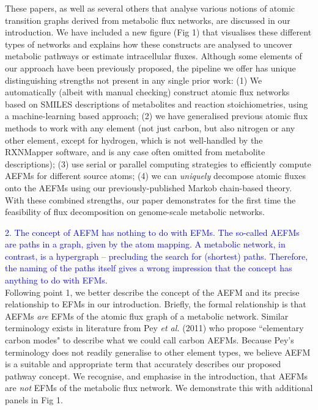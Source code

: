 \documentclass[11pt]{article}
\begin{document}
These papers, as well as several others that analyse various notions of
atomic transition graphs derived from metabolic flux networks, are
discussed in our introduction. We have included a new figure (Fig 1) that
visualises these different types of networks and explains how these
constructs are analysed to uncover metabolic pathways or estimate
intracellular fluxes. Although some elements of our approach have been
previously proposed, the pipeline we offer has unique distinguishing
strengths not present in any single prior work: (1) We automatically
(albeit with manual checking) construct atomic flux networks based on
SMILES descriptions of metabolites and reaction stoichiometries, using
a machine-learning based approach; (2) we have generalised previous atomic
flux methods to work with any element (not just carbon, but also nitrogen
or any other element, except for hydrogen, which is not well-handled by
the RXNMapper software, and is any case often omitted from metabolite
descriptions); (3) use serial or parallel computing strategies to
efficiently compute AEFMs for different source atoms; (4) we can
\textit{uniquely} decompose atomic fluxes onto the AEFMs using our
previously-published Markob chain-based theory. With these combined
strengths, our paper demonstrates for the first time the feasibility of
flux decomposition on genome-scale metabolic networks.

\noindent\textcolor{blue}{2. The concept of AEFM has nothing to do with EFMs.
The so-called AEFMs are paths in a graph, given by the atom mapping.
A metabolic network, in contrast, is a hypergraph – precluding the search for
(shortest) paths. Therefore, the naming of the paths itself gives a wrong
impression that the concept has anything to do with EFMs.}\\

Following point 1, we better describe the concept of the AEFM and its
precise relationship to EFMs in our introduction. Briefly, the formal
relationship is that AEFMs \textit{are} EFMs of the atomic flux graph of
a metabolic network. Similar terminology exists in literature from Pey
\textit{et al.} (2011) who propose ``elementary carbon modes" to describe
what we could call carbon AEFMs. Because Pey's terminology does not
readily generalise to other element types, we believe AEFM is a suitable
and appropriate term that accurately describes our proposed pathway
concept. We recognise, and emphasise in the introduction, that AEFMs are
\textit{not} EFMs of the metabolic flux network. We demonstrate this with
additional panels in Fig 1.\\
\end{document}
